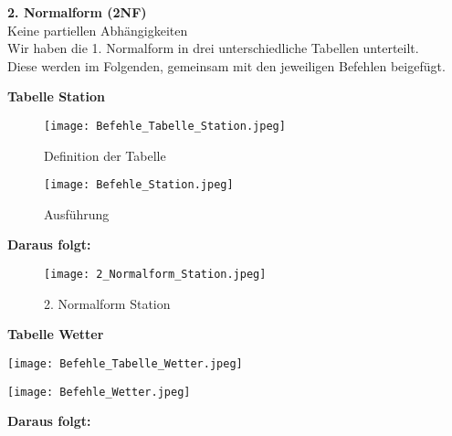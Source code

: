 \documentclass[a4paper,12pt]{article}
\begin{document}
\textbf{2. Normalform (2NF)}\\Keine partiellen Abhängigkeiten\\Wir haben die 1. Normalform in drei unterschiedliche Tabellen unterteilt.\\Diese werden im Folgenden, gemeinsam mit den jeweiligen Befehlen beigefügt. 

\newpage
\begin{center}
    
\textbf{Tabelle Station}

    

\begin{figure}[ht]
    \centering
    \begin{minipage}{0.45\textwidth}
        \centering
        \texttt{[image: Befehle\_Tabelle\_Station.jpeg]}
        \caption{Definition der Tabelle}
    \end{minipage} \hfill
    \begin{minipage}{0.5\textwidth}
        \centering
        \texttt{[image: Befehle\_Station.jpeg]}
        \caption{Ausführung}
    \end{minipage}
\end{figure}
\textbf{Daraus folgt:}




\begin{figure}[h]
    \centering
    \texttt{[image: 2\_Normalform\_Station.jpeg]}
    \caption{2. Normalform Station}
    \label{fig:enter-label}
\end{figure}
\end{center}


\begin{center}
    \textbf{Tabelle Wetter}
\end{center}





    \begin{minipage}{0.45\textwidth}
        \centering
        \texttt{[image: Befehle\_Tabelle\_Wetter.jpeg]}
    \end{minipage} \hspace{0.5cm}
    \begin{minipage}{0.45\textwidth}
        \centering
        \texttt{[image: Befehle\_Wetter.jpeg]}
    \end{minipage}
\begin{center}
    

\textbf{Daraus folgt:}

\end{center}
\end{document}
